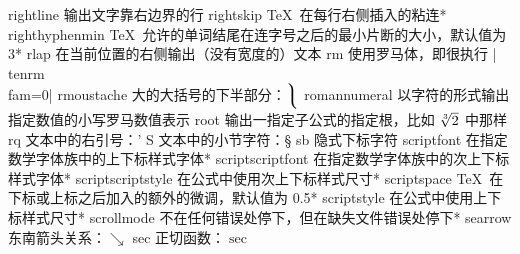 \capcs rightline {输出文字靠右边界的行}{}{}
\capcs rightskip {\TeX\ 在每行右侧插入的粘连}*{}
\capcs righthyphenmin {\TeX\ 允许的单词结尾在连字号之后的最小片断的大小，默认值为 3}*{}
\capcs rlap {在当前位置的右侧输出（没有宽度的）文本}{}{}
\capcs rm {使用罗马体，即很执行 |\\tenrm\\fam=0|}{}{}
\capcs rmoustache {大的大括号的下半部分：$\big\rmoustache$}{}{}
\capcs romannumeral {以字符的形式输出指定数值的小写罗马数值表示}{}{}
\capcs root {输出一指定子公式的指定根，比如 $\root 3 \of 2$ 中那样}{}{}
\capcs rq {文本中的右引号：\rq}{}{}
\capcs S {文本中的小节字符：\S}{}{}
\capcs sb {隐式下标字符}{}{}
\capcs scriptfont {在指定数学字体族中的上下标样式字体}*{}
\capcs scriptscriptfont {在指定数学字体族中的次上下标样式字体}*{}
\capcs scriptscriptstyle {在公式中使用次上下标样式尺寸}*{}
\capcs scriptspace {\TeX\ 在下标或上标之后加入的额外的微调，默认值为 0.5\pt}*{}
\capcs scriptstyle {在公式中使用上下标样式尺寸}*{}
\capcs scrollmode {不在任何错误处停下，但在缺失文件错误处停下}*{}
\capcs searrow {东南箭头关系：$\searrow$}{}{}
\capcs sec {正切函数：$\sec$}{}{}
